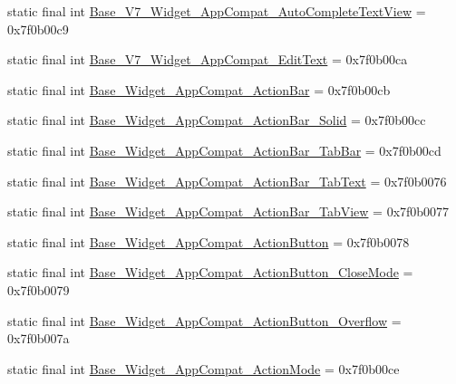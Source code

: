 \begin{CompactItemize}
\item 
static final int \hyperlink{classandroid_1_1support_1_1graphics_1_1drawable_1_1_r_1_1style_bd44acff936e1ff20988c236a30704f2}{Base\_\-V7\_\-Widget\_\-AppCompat\_\-AutoCompleteTextView} = 0x7f0b00c9
\item 
static final int \hyperlink{classandroid_1_1support_1_1graphics_1_1drawable_1_1_r_1_1style_a26fafd201ef511ed147b2a73606a4db}{Base\_\-V7\_\-Widget\_\-AppCompat\_\-EditText} = 0x7f0b00ca
\item 
static final int \hyperlink{classandroid_1_1support_1_1graphics_1_1drawable_1_1_r_1_1style_f3198726e9fc73ed3fa291aa7a5a8171}{Base\_\-Widget\_\-AppCompat\_\-ActionBar} = 0x7f0b00cb
\item 
static final int \hyperlink{classandroid_1_1support_1_1graphics_1_1drawable_1_1_r_1_1style_c21e49f662108b82e39e580953871e6d}{Base\_\-Widget\_\-AppCompat\_\-ActionBar\_\-Solid} = 0x7f0b00cc
\item 
static final int \hyperlink{classandroid_1_1support_1_1graphics_1_1drawable_1_1_r_1_1style_74b1ecc32605d7a91666b3e11ac4bf9f}{Base\_\-Widget\_\-AppCompat\_\-ActionBar\_\-TabBar} = 0x7f0b00cd
\item 
static final int \hyperlink{classandroid_1_1support_1_1graphics_1_1drawable_1_1_r_1_1style_6e3abedc2e9a72e9b0c423a765f3c328}{Base\_\-Widget\_\-AppCompat\_\-ActionBar\_\-TabText} = 0x7f0b0076
\item 
static final int \hyperlink{classandroid_1_1support_1_1graphics_1_1drawable_1_1_r_1_1style_1319e8c53d7a87ade96c5d7afcf73fd8}{Base\_\-Widget\_\-AppCompat\_\-ActionBar\_\-TabView} = 0x7f0b0077
\item 
static final int \hyperlink{classandroid_1_1support_1_1graphics_1_1drawable_1_1_r_1_1style_fece8184c0a31c527a9ac332a0c4f450}{Base\_\-Widget\_\-AppCompat\_\-ActionButton} = 0x7f0b0078
\item 
static final int \hyperlink{classandroid_1_1support_1_1graphics_1_1drawable_1_1_r_1_1style_be351cd66e2be530cc209b05132084d1}{Base\_\-Widget\_\-AppCompat\_\-ActionButton\_\-CloseMode} = 0x7f0b0079
\item 
static final int \hyperlink{classandroid_1_1support_1_1graphics_1_1drawable_1_1_r_1_1style_fca76a866a3a065595806fa9967eef6a}{Base\_\-Widget\_\-AppCompat\_\-ActionButton\_\-Overflow} = 0x7f0b007a
\item 
static final int \hyperlink{classandroid_1_1support_1_1graphics_1_1drawable_1_1_r_1_1style_5a9b99d5f3ee6b7da94f3cc42bdaffd1}{Base\_\-Widget\_\-AppCompat\_\-ActionMode} = 0x7f0b00ce
\item 

\end{CompactItemize}
